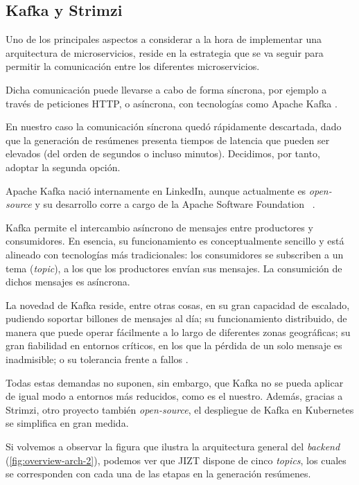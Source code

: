 \subsection{Kafka y Strimzi} \label{subsec:kafka}

Uno de los principales aspectos a considerar a la hora de implementar una arquitectura de microservicios, reside en la estrategia que se va seguir para permitir la comunicación entre los diferentes microservicios.

Dicha comunicación puede llevarse a cabo de forma síncrona, por ejemplo a través de peticiones HTTP, o asíncrona, con tecnologías como Apache Kafka \cite{microsoft-microsvcs}.

En nuestro caso la comunicación síncrona quedó rápidamente descartada, dado que la generación de resúmenes presenta tiempos de latencia que pueden ser elevados (del orden de segundos o incluso minutos). Decidimos, por tanto, adoptar la segunda opción.

Apache Kafka nació internamente en LinkedIn, aunque actualmente es \emph{open-source} y su desarrollo corre a cargo de la Apache Software Foundation ~\cite{wiki-kafka}.

Kafka permite el intercambio asíncrono de mensajes entre productores y consumidores. En esencia, su funcionamiento es conceptualmente sencillo y está alineado con tecnologías más tradicionales: los consumidores se subscriben a un tema (\emph{topic}), a los que los productores envían sus mensajes. La consumición de dichos mensajes es asíncrona.

La novedad de Kafka reside, entre otras cosas, en su gran capacidad de escalado, pudiendo soportar billones de mensajes al día; su funcionamiento distribuido, de manera que puede operar fácilmente a lo largo de diferentes zonas geográficas; su gran fiabilidad en entornos críticos, en los que la pérdida de un solo mensaje es inadmisible; o su tolerancia frente a fallos \cite{apache-kafka}.

Todas estas demandas no suponen, sin embargo, que Kafka no se pueda aplicar de igual modo a entornos más reducidos, como es el nuestro. Además, gracias a Strimzi, otro proyecto también \emph{open-source}, el despliegue de Kafka en Kubernetes se simplifica en gran medida.

Si volvemos a observar la figura que ilustra la arquitectura general del \emph{backend} (\autoref{fig:overview-arch-2}), podemos ver que JIZT dispone de cinco \emph{topics}, los cuales se corresponden con cada una de las etapas en la generación resúmenes.

